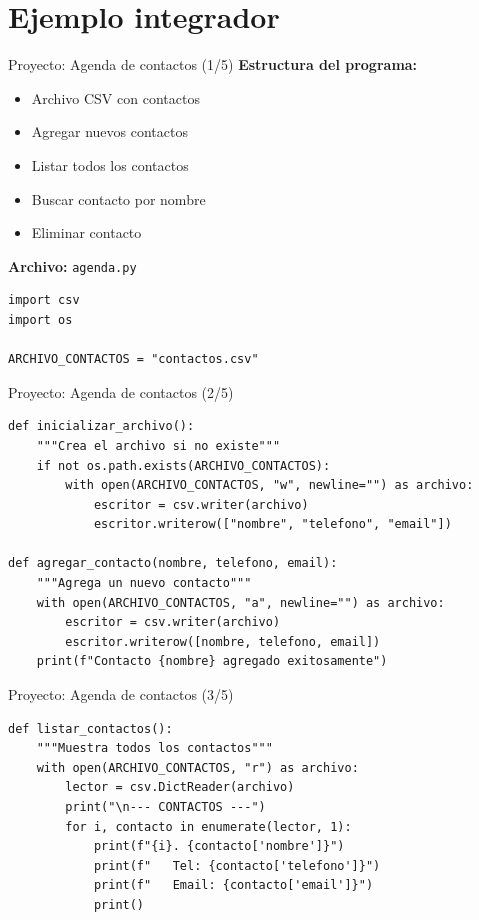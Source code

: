 \documentclass{beamer}
\begin{document}
\section{Ejemplo integrador}

\begin{frame}[fragile]{Proyecto: Agenda de contactos (1/5) \faAddressBook}
\textbf{Estructura del programa:}
\small
\begin{itemize}
    \item[\faFile] Archivo CSV con contactos
    \item[\faPlus] Agregar nuevos contactos
    \item[\faList] Listar todos los contactos
    \item[\faSearch] Buscar contacto por nombre
    \item[\faTrash] Eliminar contacto
\end{itemize}

\vspace{0.2cm}
\textbf{Archivo:} \texttt{agenda.py}
\begin{lstlisting}
import csv
import os

ARCHIVO_CONTACTOS = "contactos.csv"
\end{lstlisting}
\end{frame}

\begin{frame}[fragile]{Proyecto: Agenda de contactos (2/5) \faCode}
\begin{lstlisting}
def inicializar_archivo():
    """Crea el archivo si no existe"""
    if not os.path.exists(ARCHIVO_CONTACTOS):
        with open(ARCHIVO_CONTACTOS, "w", newline="") as archivo:
            escritor = csv.writer(archivo)
            escritor.writerow(["nombre", "telefono", "email"])

def agregar_contacto(nombre, telefono, email):
    """Agrega un nuevo contacto"""
    with open(ARCHIVO_CONTACTOS, "a", newline="") as archivo:
        escritor = csv.writer(archivo)
        escritor.writerow([nombre, telefono, email])
    print(f"Contacto {nombre} agregado exitosamente")
\end{lstlisting}
\end{frame}

\begin{frame}[fragile]{Proyecto: Agenda de contactos (3/5) \faList}
\begin{lstlisting}
def listar_contactos():
    """Muestra todos los contactos"""
    with open(ARCHIVO_CONTACTOS, "r") as archivo:
        lector = csv.DictReader(archivo)
        print("\n--- CONTACTOS ---")
        for i, contacto in enumerate(lector, 1):
            print(f"{i}. {contacto['nombre']}")
            print(f"   Tel: {contacto['telefono']}")
            print(f"   Email: {contacto['email']}")
            print()
\end{lstlisting}
\end{frame}
\end{document}
